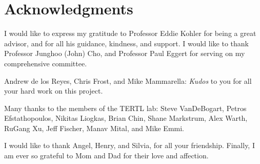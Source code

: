 \section{Acknowledgments}
\label{sec:ack}

I would like to express my gratitude to Professor Eddie Kohler for being a
great advisor, and for all his guidance, kindness, and support. I would like to
thank Professor Junghoo (John) Cho, and Professor Paul Eggert for serving on
my comprehensive committee.

Andrew de los Reyes, Chris Frost, and Mike Mammarella: \emph{Kudos} to you
for all your hard work on this project.

Many thanks to the members of the TERTL lab: Steve VanDeBogart,
Petros Efstathopoulos, Nikitas Liogkas, Brian Chin, Shane Markstrum,
Alex Warth, RuGang Xu, Jeff Fischer, Manav Mital, and Mike Emmi.

I would like to thank Angel, Henry, and Silvia, for all your friendship.
Finally, I am ever so grateful to Mom and Dad for their love and affection.


